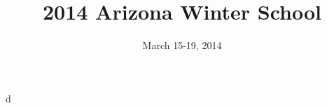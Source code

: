 \documentclass{article}
\title{2014 Arizona Winter School}
\date{March 15-19, 2014}
\begin{document}
\maketitle





d
\end{document}
